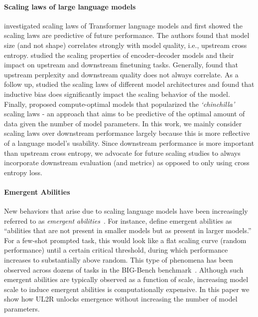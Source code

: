 \documentclass{article}
\newcommand{\methodname}{UL2R\xspace}
\begin{document}
\paragraph{Scaling laws of large language models} \citet{kaplan2020scaling} investigated scaling laws of Transformer language models and first showed the scaling laws are predictive of future performance. The authors found that model size (and not shape) correlates strongly with model quality, i.e., upstream cross entropy. \citet{tay2021scale} studied the scaling properties of encoder-decoder models and their impact on upstream and downstream finetuning tasks. Generally, \citet{tay2021scale} found that upstream perplexity and downstream quality does not always correlate. As a follow up, \citet{tay2022scaling} studied the scaling laws of different model architectures and found that inductive bias does significantly impact the scaling behavior of the model. Finally, \citet{hoffmann2022training} proposed compute-optimal models that popularized the \textit{`chinchilla'} scaling laws - an approach that aims to be predictive of the optimal amount of data given the number of model parameters. In this work, we mainly consider scaling laws over downstream performance largely because this is more reflective of a language model's usability. Since downstream performance is more important than upstream cross entropy, we advocate for future scaling studies to always incorporate downstream evaluation (and metrics) as opposed to only using cross entropy loss.  

\paragraph{Emergent Abilities}
New behaviors that arise due to scaling language models have been increasingly referred to as \textit{emergent abilities}~\citep{jacobsdefinition,ganguli2022predictability,wei2022emergent}.
For instance, \citet{wei2022emergent} define emergent abilities as ``abilities that are not present in smaller models but as present in larger models.''
For a few-shot prompted task, this would look like a flat scaling curve (random performance) until a certain critical threshold, during which performance increases to substantially above random.
This type of phenomena has been observed across dozens of tasks in the BIG-Bench benchmark~\citep{srivastava2022beyond}.
Although such emergent abilities are typically observed as a function of scale, increasing model scale to induce emergent abilities is computationally expensive.
In this paper we show how \methodname unlocks emergence without increasing the number of model parameters.
\end{document}
